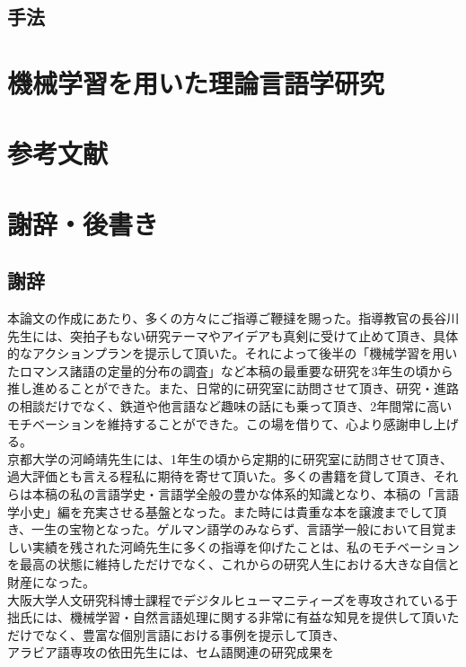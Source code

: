 \documentclass[12pt, oneside]{book} %
\begin{document}
\chapter{手法}
\part{機械学習を用いた理論言語学研究}
\part{参考文献}
\part{謝辞・後書き}
\chapter{謝辞}
本論文の作成にあたり、多くの方々にご指導ご鞭撻を賜った。指導教官の長谷川先生には、突拍子もない研究テーマやアイデアも真剣に受けて止めて頂き、具体的なアクションプランを提示して頂いた。それによって後半の「機械学習を用いたロマンス諸語の定量的分布の調査」など本稿の最重要な研究を3年生の頃から推し進めることができた。また、日常的に研究室に訪問させて頂き、研究・進路の相談だけでなく、鉄道や他言語など趣味の話にも乗って頂き、2年間常に高いモチベーションを維持することができた。この場を借りて、心より感謝申し上げる。
\\京都大学の河崎靖先生には、1年生の頃から定期的に研究室に訪問させて頂き、過大評価とも言える程私に期待を寄せて頂いた。多くの書籍を貸して頂き、それらは本稿の私の言語学史・言語学全般の豊かな体系的知識となり、本稿の「言語学小史」編を充実させる基盤となった。また時には貴重な本を譲渡までして頂き、一生の宝物となった。ゲルマン語学のみならず、言語学一般において目覚ましい実績を残された河崎先生に多くの指導を仰げたことは、私のモチベーションを最高の状態に維持しただけでなく、これからの研究人生における大きな自信と財産になった。
\\大阪大学人文研究科博士課程でデジタルヒューマニティーズを専攻されている于拙氏には、機械学習・自然言語処理に関する非常に有益な知見を提供して頂いただけでなく、豊富な個別言語における事例を提示して頂き、
\\アラビア語専攻の依田先生には、セム語関連の研究成果を
\backmatter

 
\end{document}
